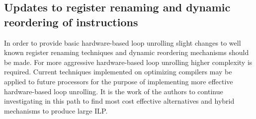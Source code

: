 \documentclass[11pt]{article}
\begin{document}
\subsection{Updates to register renaming and dynamic reordering of instructions}
In order to provide basic hardware-based loop unrolling slight changes to well known register renaming techniques and dynamic reordering mechanisms should be made. 
For more aggressive hardware-based loop unrolling higher complexity is required. Current techniques implemented on optimizing compilers may be applied to future processors for the purpose of implementing more effective hardware-based loop unrolling. It is the work of the authors to continue investigating in this path to find most cost effective alternatives and hybrid mechanisms to produce large ILP.   

%
\end{document}
